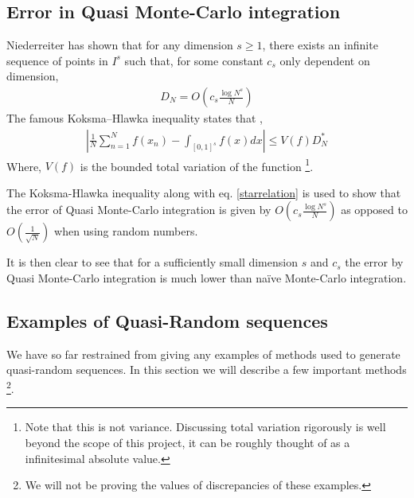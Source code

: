 \documentclass[12pt]{article}
\numberwithin{equation}{section}
\begin{document}
\subsection{Error in Quasi Monte-Carlo integration}
Niederreiter has shown \cite{Niederreiter1978QuasiMonteCM} that for any dimension $s \geq 1$, there exists an infinite sequence of points in $I^s$ such that, for some constant $c_s$ only dependent on dimension, 
\begin{align*}
    D_N = O \left(c_s \frac{\log N ^s}{N}\right)
\end{align*}
The famous Koksma–Hlawka inequality states that \cite{Niederreiter1978QuasiMonteCM},
\begin{align*}
    \left| \frac{1}{N} \sum_{n=1}^{N} f(x_n)-\int_{[0,1]^s} f(x) dx \right| \leq V(f) D_N^*
\end{align*}
Where, $V(f)$ is the bounded total variation of the function \footnote{Note that this is not variance. Discussing total variation rigorously is well beyond the scope of this project, it can be roughly thought of as a infinitesimal absolute value.}.
\par The Koksma-Hlawka inequality along with eq. \ref{starrelation} is used to show that the error of Quasi Monte-Carlo integration is given by $O \left(c_s \frac{\log N ^s}{N}\right)$ as opposed to $O \left(\frac{1}{\sqrt{N}}\right)$ when using random numbers.
\par It is then clear to see that for a sufficiently small dimension $s$ and $c_s$ the error by Quasi Monte-Carlo integration is much lower than naïve Monte-Carlo integration.
\subsection{Examples of Quasi-Random sequences}
We have so far restrained from giving any examples of methods used to generate quasi-random sequences. In this section we will describe a few important methods \footnote{We will not be proving the values of discrepancies of these examples.}.
\end{document}

